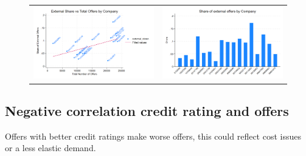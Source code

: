 \documentclass[12pt]{article}
\begin{document}
\begin{figure}[H]
\caption{}
 \label{fig:ie4_2and3}
\centering{}%
\begin{tabular}{cc}
\includegraphics[scale=0.27]{figures/IE4/IE4_total_internal_offers_bycompany.png} & \includegraphics[scale=0.27]{figures/IE4/IE4_variation_share_external.png}
\end{tabular}
\end{figure} 

\newpage

\subsection{Negative correlation credit rating and offers}

Offers with better credit ratings make worse offers, this could reflect cost issues or a less elastic demand. 
\end{document}
